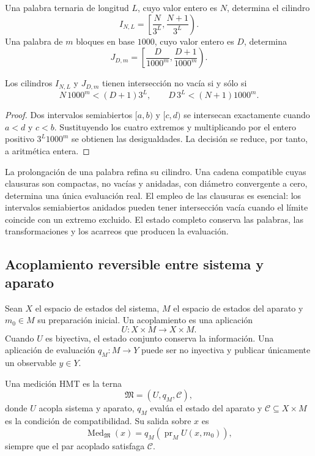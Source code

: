 Una palabra ternaria de longitud \(L\), cuyo valor entero es \(N\), determina
el cilindro
\[
 I_{N,L}=\left[\frac{N}{3^L},\frac{N+1}{3^L}\right).
\]
Una palabra de \(m\) bloques en base \(1000\), cuyo valor entero es \(D\),
determina
\[
 J_{D,m}=\left[\frac{D}{1000^m},\frac{D+1}{1000^m}\right).
\]

\begin{lemma}
Los cilindros \(I_{N,L}\) y \(J_{D,m}\) tienen intersección no vacía si y
sólo si
\[
 N\,1000^m<(D+1)3^L,
 \qquad
 D\,3^L<(N+1)1000^m.
\]
\end{lemma}
\begin{proof}
Dos intervalos semiabiertos \([a,b)\) y \([c,d)\) se intersecan exactamente
cuando \(a<d\) y \(c<b\). Sustituyendo los cuatro extremos y multiplicando
por el entero positivo \(3^L1000^m\) se obtienen las desigualdades. La
decisión se reduce, por tanto, a aritmética entera.
\end{proof}

La prolongación de una palabra refina su cilindro. Una cadena compatible cuyas
clausuras son compactas, no vacías y anidadas, con diámetro convergente a cero,
determina una única evaluación real. El empleo de las clausuras es esencial:
los intervalos semiabiertos anidados pueden tener intersección vacía cuando el
límite coincide con un extremo excluido. El estado completo conserva las
palabras, las transformaciones y los acarreos que producen la evaluación.

\subsection{Acoplamiento reversible entre sistema y aparato}

Sean \(X\) el espacio de estados del sistema, \(M\) el espacio de estados del
aparato y \(m_0\in M\) su preparación inicial. Un acoplamiento es una
aplicación
\[
 U:X\times M\longrightarrow X\times M.
\]
Cuando \(U\) es biyectiva, el estado conjunto conserva la información. Una
aplicación de evaluación \(q_M:M\to Y\) puede ser no inyectiva y publicar
únicamente un observable \(y\in Y\).

\begin{definition}[Medición]
Una medición HMT es la terna
\[
 \mathfrak M=(U,q_M,\mathcal C),
\]
donde \(U\) acopla sistema y aparato, \(q_M\) evalúa el estado del aparato y
\(\mathcal C\subseteq X\times M\) es la condición de compatibilidad. Su
salida sobre \(x\) es
\[
 \operatorname{Med}_{\mathfrak M}(x)
 =q_M\!\left(\operatorname{pr}_M U(x,m_0)\right),
\]
siempre que el par acoplado satisfaga \(\mathcal C\).
\end{definition}

